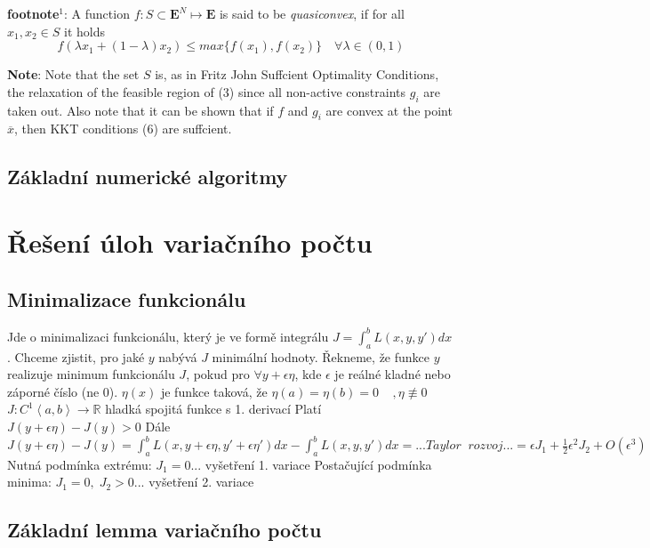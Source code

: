 \documentclass[a4]{report}
\theoremstyle{definition}
\begin{document}
{\textbf{footnote$^{1}$}: A function $f: S \subset \mathbf{E}^{N} \mapsto \mathbf{E}$ is said to be \textit{quasiconvex}, if for all 
$x_{1}, x_{2} \in S$ it holds
$$ f(\lambda x_{1} + (1-\lambda )x_{2}) \leq max\{ f(x_{1}),f(x_{2})\} \quad  \forall \lambda \in (0,1) $$

\textbf{Note}: Note that the set $S$ is, as in Fritz John Suffcient Optimality Conditions, the relaxation of the feasible region of (3)
since all non-active constraints $g_{i}$ are taken out. Also note that it can be shown that if $f$
and $g_{i}$ are convex at the point $\overline{x}$, then KKT conditions (6) are suffcient.

\subsection{Základní numerické algoritmy}


\section{Řešení úloh variačního počtu}

\subsection{Minimalizace funkcionálu}
Jde o minimalizaci funkcionálu, který je ve formě integrálu $J=\int_{a}^{b}L(x,y,{y}')dx $. Chceme zjistit, pro jaké $y$ nabývá $J$ minimální hodnoty. 
Řekneme, že funkce $y$ realizuje minimum funkcionálu $J$, pokud pro $\forall y+\epsilon \eta  $, kde $\epsilon $ je reálné kladné nebo záporné číslo (ne 0).
\newline $\eta (x)$ je funkce taková, že $\eta (a)=\eta (b)=0\; \; \; \; ,\eta \not\equiv 0$
\newline $J:C^{1}\left \langle a,b \right \rangle\rightarrow \mathbb{R}$ hladká spojitá funkce s 1. derivací
\newline Platí $J(y+\epsilon \eta )-J(y)> 0$
\newline Dále $J(y+\epsilon \eta )-J(y)=\int_{a}^{b}L(x,y+\epsilon \eta ,{y}'+\epsilon {\eta }')dx-\int_{a}^{b}L(x,y,{y}')dx=...Taylor\; \;  rozvoj...=\epsilon J_{1}+\frac{1}{2}\epsilon ^{2}J_{2}+O(\epsilon ^{3})$
\newline Nutná podmínka extrému: $J_{1}=0$... vyšetření 1. variace
\newline Postačující podmínka minima: $J_{1}=0,\; J_{2}> 0$... vyšetření 2. variace

\subsection{Základní lemma variačního počtu}

}
\end{document}
